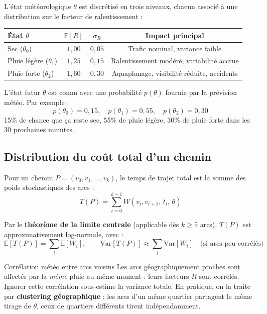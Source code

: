 \documentclass[12pt,a4paper]{article}
\theoremstyle{definition}
\theoremstyle{remark}
\begin{document}
L'état météorologique $\theta$ est discrétisé en trois niveaux,
chacun associé à une distribution sur le facteur de ralentissement :

\begin{center}
\begin{tabular}{lccc}
  \toprule
  \textbf{État $\theta$} & \textbf{$\mathbb{E}[R]$} &
  \textbf{$\sigma_R$} & \textbf{Impact principal} \\
  \midrule
  Sec ($\theta_0$)          & $1{,}00$ & $0{,}05$ &
    Trafic nominal, variance faible \\
  Pluie légère ($\theta_1$) & $1{,}25$ & $0{,}15$ &
    Ralentissement modéré, variabilité accrue \\
  Pluie forte ($\theta_2$)  & $1{,}60$ & $0{,}30$ &
    Aquaplanage, visibilité réduite, accidents \\
  \bottomrule
\end{tabular}
\end{center}

\noindent L'état futur $\theta$ est connu avec une probabilité $p(\theta)$
fournie par la prévision météo. Par exemple :
\[
  p(\theta_0) = 0{,}15, \quad
  p(\theta_1) = 0{,}55, \quad
  p(\theta_2) = 0{,}30
\]
\og{}15\% de chance que ça reste sec, 55\% de pluie légère,
30\% de pluie forte dans les 30 prochaines minutes.\fg{}

\subsection{Distribution du coût total d'un chemin}

Pour un chemin $P = (v_0, v_1, \ldots, v_k)$, le temps de trajet
total est la somme des poids stochastiques des arcs :
\[
  T(P) = \sum_{i=0}^{k-1} W(v_i, v_{i+1},\, t_i,\, \theta)
\]

Par le \textbf{théorème de la limite centrale} (applicable dès
$k \geq 5$ arcs), $T(P)$ est approximativement log-normale,
avec :
\[
  \mathbb{E}[T(P)] = \sum_{i} \mathbb{E}[W_i], \qquad
  \text{Var}[T(P)] \approx \sum_{i} \text{Var}[W_i]
  \quad\text{(si arcs peu corrélés)}
\]

\begin{alertbox}{Corrélation météo entre arcs voisins}
Les arcs géographiquement proches sont affectés par la \emph{même}
pluie au même moment : leurs facteurs $R$ sont corrélés. Ignorer
cette corrélation sous-estime la variance totale. En pratique,
on la traite par \textbf{clustering géographique} : les arcs d'un
même quartier partagent le même tirage de $\theta$, ceux de quartiers
différents tirent indépendamment.
\end{alertbox}
\end{document}
